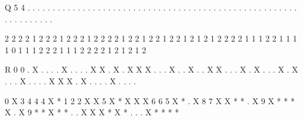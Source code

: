 \begin{datain}
Q 5 4
. . . . . . . .
. . . . . . . .
. . . . . . . .
. . . . . . . .
. . . . . . . .
. . . . . . . .
. . . . . . . .
. . . . . . . .
\end{datain}
\begin{dataout}
2 2 2 2 1 2 2 2
1 2 2 2 1 2 2 2
2 1 2 2 1 2 2 1
2 2 1 2 1 2 1 2
2 2 2 1 1 1 2 2
1 1 1 1 0 1 1 1
2 2 2 1 1 1 2 2
2 2 1 2 1 2 1 2
\end{dataout}

\begin{datain}
R 0 0
. X . . . . X .
. . . X X . X .
X X X . . . X .
. X . . X X . .
. X . X . . . X
. X . . . X . .
. . X X X . X .
. . . X . . . .
\end{datain}
\begin{dataout}
0 X 3 4 4 4 X *
1 2 2 X X 5 X *
X X X 6 6 5 X *
. X 8 7 X X * *
. X 9 X * * * X
. X 9 * * X * *
. . X X X * X *
. . . X * * * *
\end{dataout}
